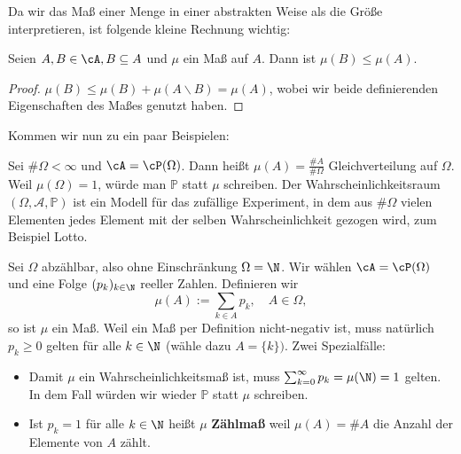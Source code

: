 Da wir das Ma\ss{} einer Menge in einer abstrakten Weise als die \glqq Gr\"o\ss e\grqq{} interpretieren, ist folgende kleine Rechnung wichtig:
\begin{lemma}[Monotonie]
	Seien $A, B \in \cA, B \subseteq A$ und $\mu $ ein Maß auf $A$. Dann ist $\mu(B) \leq \mu(A).$
\end{lemma}

\begin{proof}
	$\mu(B) \leq \mu(B) + \mu(A\backslash B) = \mu(A)$, wobei wir beide definierenden Eigenschaften des Ma\ss es genutzt haben.
\end{proof}
Kommen wir nun zu ein paar Beispielen:
\begin{beispiel}
	Sei $\#\Omega < \infty$ und $\cA = \cP(\Omega)$. Dann hei\ss t $\mu(A) = \frac{\#A}{\#\Omega}$ Gleichverteilung auf $\Omega$. Weil $\mu (\Omega) = 1$, würde man $\mathbb P$ statt $\mu$ schreiben. Der Wahrscheinlichkeitsraum $(\Omega, \mathcal A, \mathbb P)$ ist ein Modell f\"ur das zuf\"allige Experiment, in dem aus $\#\Omega$ vielen Elementen jedes Element mit der selben Wahrscheinlichkeit gezogen wird, zum Beispiel Lotto.
\end{beispiel}

\begin{beispiel}
	Sei $\Omega$ abzählbar, also ohne Einschr\"ankung $\Omega = \N$. Wir w\"ahlen $\cA = \cP(\Omega)$ und eine Folge $(p_k)_{k \in \N}$ reeller Zahlen. Definieren wir $$\mu(A):= \sum\limits_{k \in A} p_k, \quad A \in \Omega,$$ so ist $\mu$ ein Ma\ss. Weil ein Ma\ss{} per Definition nicht-negativ ist, muss nat\"urlich $p_k\geq 0$ gelten f\"ur alle $k\in \N$ (w\"ahle dazu $A=\{k\})$. Zwei Spezialf\"alle:
	\begin{itemize}
		\item Damit $\mu$ ein Wahrscheinlichkeitsma\ss{} ist, muss $\sum_{k=0}^\infty p_k=\mu(\N)=1$ gelten. In dem Fall w\"urden wir wieder $\mathbb P$ statt $\mu$ schreiben.
		\item Ist $p_k=1$ f\"ur alle $k\in\N$ hei\ss t $\mu$ \textbf{Z\"ahlma\ss} weil $\mu(A)=\# A$ die Anzahl der Elemente von $A$ z\"ahlt.
	\end{itemize}
\end{beispiel}

